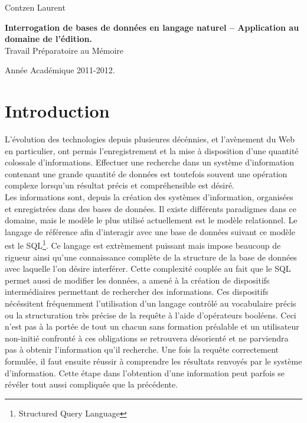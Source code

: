 \documentclass[12pt]{article}
\author{Contzen Laurent}
\begin{document}
\begin{titlepage}  
  \begin{flushleft}
    Contzen Laurent
  \end{flushleft}
  \begin{center}
    \vspace{82mm}\LARGE{\textbf{Interrogation de bases de données en langage naturel – Application au domaine de l’édition.} \\    
      Travail Préparatoire au Mémoire}
  \end{center}
  \begin{flushright}
    \vspace{92mm}
    Année Académique 2011-2012.             
  \end{flushright}
\end{titlepage}

\tableofcontents
\newpage

\section{Introduction}
L'évolution des technologies depuis plusieures décénnies, et l'avènement du Web en particulier, ont permis l'enregistrement et la mise à disposition d'une quantité colossale d'informations.
Effectuer une recherche dans un système d'information contenant une grande quantité de données est toutefois souvent une opération complexe lorsqu'un résultat précis et compréhensible est désiré. \\

Les informations sont, depuis la création des systèmes d'information, organisées et enregistrées dans des bases de données.
Il existe différents paradigmes dans ce domaine, mais le modèle le plus utilisé actuellement est le modèle relationnel.
Le langage de référence afin d'interagir avec une base de données suivant ce modèle est le SQL\footnote{Structured Query Language}.
Ce langage est extrèmement puissant mais impose beaucoup de rigueur ainsi qu'une connaissance complète de la structure de la base de données avec laquelle l'on désire interférer.
Cette complexité couplée au fait que le SQL permet aussi de modifier les données, a amené à la création de dispositifs intermédiaires permettant de rechercher des informations.
Ces dispositifs nécéssitent fréquemment l'utilisation d'un langage contrôlé au vocabulaire précis ou la structuration très précise de la requête à l'aide d'opérateurs booléens. 
Ceci n'est pas à la portée de tout un chacun sans formation préalable et un utilisateur non-initié confronté à ces obligations se retrouvera désorienté et ne parviendra pas à obtenir l'information qu'il recherche. 
Une fois la requête correctement formulée, il faut ensuite réussir à comprendre les résultats renvoyés par le système d'information.
Cette étape dans l'obtention d'une information peut parfois se révéler tout aussi compliquée que la précédente. \\
\end{document}
